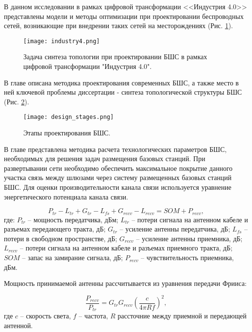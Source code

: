 В данном исследовании в рамках цифровой трансформации <<Индустрия 4.0>> представлены модели и методы оптимизации при проектировании беспроводных сетей, возникающие при внедрении таких сетей на месторождениях  (Рис. \cref{fig:industry4}).

\begin{figure}[h!]
  \centering
   \texttt{[image: industry4.png]}
\caption{Задача синтеза топологии при проектировании БШС в рамках цифровой трансформации "Индустрия 4.0".}
\label{fig:industry4}
\end{figure}

В главе описана методика проектирования современных БШС, а также место в ней ключевой проблемы диссертации - синтеза топологической структуры БШС (Рис. \cref{fig:part1_design_stages}). 

\begin{figure}[h!]
    \centering
     \texttt{[image: design\_stages.png]}
  \caption{Этапы проектирования БШС.}
  \label{fig:part1_design_stages}
  \end{figure}


В главе представлена методика расчета технологических параметров БШС, необходимых для решения задач размещения базовых станций. При развертывании сети необходимо обеспечить максимальное покрытие данного участка связь между шлюзами через систему размещенных базовых станций БШС. Для оценки производительности канала связи используется уравнение энергетического потенциала канала связи. 

\begin{equation}
\label{eq:part3_link_budget}
P_{tr} - L_{tr} + G_{tr} - L_{fs} + G_{recv} - L_{recv} = SOM + P_{recv},
\end{equation}
где: $P_{tr}$ -- мощность передатчика, дБм; $L_{tr}$ -- потери сигнала на антенном кабеле и разъемах передающего тракта, дБ; $G_{tr}$ -- усиление антенны передатчика, дБ; $L_{fs}$ -- потери в свободном пространстве, дБ; $G_{recv}$ -- усиление антенны приемника, дБ; $L_{recv}$ -- потери сигнала на антенном кабеле и разъемах приемного тракта, дБ; $SOM$ -- запас на замирание сигнала, дБ; $P_{recv}$ -- чувствительность приемника, дБм.


Мощность принимаемой антенны рассчитывается из уравнения передачи Фрииса:

\begin{displaymath}
\label{eq:part3_Friis}
\frac{P_{recv}}{P_{tr}} = G_{tr}G_{recv}\left(\frac{c}{4\pi R f} \right)^2,
\end{displaymath}
где
$c$ --  скорость света,
$f$ -- частота, 
$R$ рассточние между приемной и передающей антенной.

